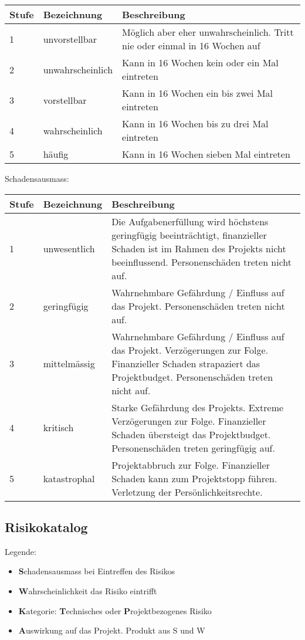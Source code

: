 \vspace{1em}
\noindent
\begin{tabularx}{\textwidth}{|l|l|X|}
	\hline
	\textbf{Stufe} & \textbf{Bezeichnung} & \textbf{Beschreibung} \\
	\hline
	1 & unvorstellbar & Möglich aber eher unwahrscheinlich. Tritt nie oder einmal in 16 Wochen auf \\
	\hline
	2 & unwahrscheinlich & Kann in 16 Wochen kein oder ein Mal eintreten\\
	\hline
	3 & vorstellbar & Kann in 16 Wochen ein bis zwei Mal eintreten \\
	\hline
	4 & wahrscheinlich & Kann in 16 Wochen bis zu drei Mal eintreten \\
	\hline
	5 & häufig & Kann in 16 Wochen sieben Mal eintreten\\
	\hline
\end{tabularx}

\vspace{1em}
\noindent
Schadensausmass:

\vspace{1em}
\noindent
\begin{tabularx}{\textwidth}{|l|l|X|}
	\hline
	\textbf{Stufe} & \textbf{Bezeichnung} & \textbf{Beschreibung} \\
	\hline
	1 & unwesentlich & Die Aufgabenerfüllung wird höchstens geringfügig beeinträchtigt, finanzieller Schaden ist im Rahmen des Projekts nicht beeinflussend. Personenschäden treten nicht auf. \\
	\hline
	2 & geringfügig & Wahrnehmbare Gefährdung / Einfluss auf das Projekt. Personenschäden treten nicht auf. \\
	\hline
	3 & mittelmässig & Wahrnehmbare Gefährdung / Einfluss auf das Projekt. Verzögerungen zur Folge. Finanzieller Schaden strapaziert das Projektbudget. Personenschäden treten nicht auf. \\
	\hline
	4 & kritisch & Starke Gefährdung des Projekts. Extreme Verzögerungen zur Folge. Finanzieller Schaden übersteigt das Projektbudget. Personenschäden treten geringfügig auf.\\
	\hline
	5 & katastrophal & Projektabbruch zur Folge. Finanzieller Schaden kann zum Projektstopp führen. Verletzung der Persönlichkeitsrechte. \\
	\hline
\end{tabularx}

\newpage

\subsection{Risikokatalog}
\label{sssec:Risikokatalog}
Legende:
\begin{itemize}
	\item \textbf{S}chadensausmass bei Eintreffen des Risikos
	\item \textbf{W}ahrscheinlichkeit das Risiko eintrifft
	\item \textbf{K}ategorie: \textbf{T}echnisches oder \textbf{P}rojektbezogenes Risiko
	\item \textbf{A}uswirkung auf das Projekt. Produkt aus S und W
\end{itemize}

